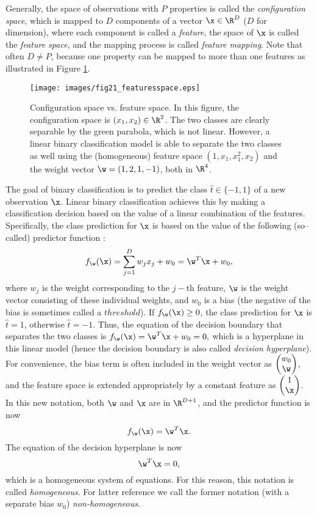 Generally, the space of observations with $P$ properties is called the \emph{configuration space}, which is mapped to $D$ components of a vector $\x \in \R^D$ ($D$ for dimension), where each component is called a \emph{feature}, the space of $\x$ is called the \emph{feature space}, and the mapping process is called \emph{feature mapping}. Note that often $D \not= P$, because one property can be mapped to more than one features as illustrated in Figure \ref{fig:featuresspace}.  

\begin{figure}[here]
\texttt{[image: images/fig21\_featuresspace.eps]}
\caption{
Configuration space vs. feature space. In this figure, the configuration space is $(x_1, x_2) \in \R^2$. The two classes are clearly separable by the green parabola, which is not linear. However, a linear binary classification model is able to separate the two classes as well using the (homogeneous) feature space $(1, x_1, x_1^2, x_2)$ and the weight vector $\w = (1, 2, 1, -1)$, both in $\R^4$.   
}
\label{fig:featuresspace}
\end{figure}


The goal of binary classification is to predict the class $\hat{t} \in \{ -1, 1 \}$ of a new observation $\x$. Linear binary classification achieves this by making a classification decision based on the value of a linear combination of the features. Specifically, the class prediction for $\x$ is based on the value of the following (so--called) predictor function \cite{bishop06}: 
\begin{equation} 
\label{eq:predictor}
f_{\w}(\x) = \sum_{j=1}^D w_j x_j + w_0 = \w^T \x + w_0,
\end{equation}
where $w_j$ is the weight corresponding to the $j-$th feature, $\w$ is the weight vector consisting of these individual weights, and $w_0$ is a bias (the negative of the bias is sometimes called a $threshold$). If $f_{\w}(\x) \geq 0$, the class prediction for $\x$ is $\hat{t} = 1$, otherwise $\hat{t} = -1$. Thus, the equation of the decision boundary that separates the two classes is $f_{\w}(\x) = \w^T \x + w_0 = 0,$
which is a hyperplane in this linear model (hence the decision boundary is also called \emph{decision hyperplane}). For convenience, the bias term is often included in the weight vector as $\begin{pmatrix}
w_0\\ \w \end{pmatrix}$, and the feature space is extended appropriately by a constant feature as $\begin{pmatrix} 1\\ \x \end{pmatrix}$. In this new notation, both $\w$ and $\x$ are in $\R^{D+1}$, and the predictor function is now $$f_{\w}(\x) = \w^T \x.$$ The equation of the decision hyperplane is now $$\w^T \x = 0,$$ which is a homogeneous system of equations. For this reason, this notation is called \emph{homogeneous}. For latter reference we call the former notation (with a separate bias $w_0$) \emph{non-homogeneous}. 

